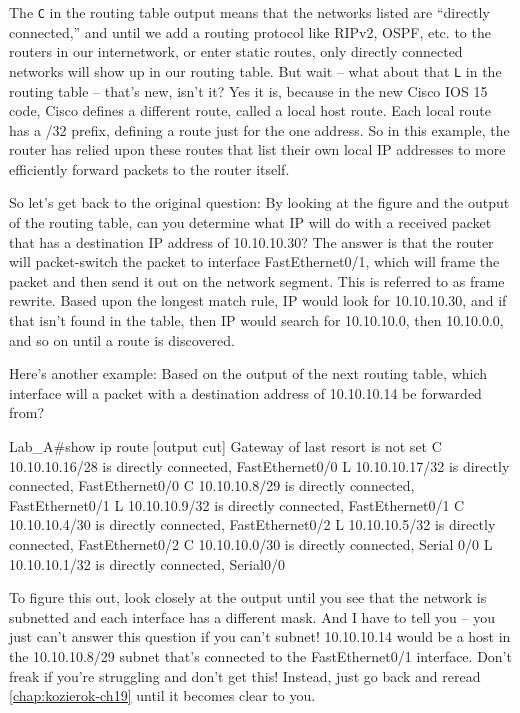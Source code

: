 The \texttt{C} in the routing table output means that the networks
listed are ``directly connected,'' and until we add a routing protocol
like RIPv2, OSPF, etc. to the routers in our internetwork, or enter
static routes, only directly connected networks will show up in our
routing table. But wait -- what about that \texttt{L} in the routing
table -- that's new, isn't it? Yes it is, because in the new Cisco IOS 15
code, Cisco defines a different route, called a local host route. Each
local route has a /32 prefix, defining a route just for the one address.
So in this example, the router has relied upon these routes that list
their own local IP addresses to more efficiently forward packets to the
router itself.

\protect\hypertarget{c09.xhtmlux5cux23Page_361}{}{}So let's get back to
the original question: By looking at the figure and the output of the
routing table, can you determine what IP will do with a received packet
that has a destination IP address of 10.10.10.30? The answer is that the
router will packet-switch the packet to interface FastEthernet0/1,
which will frame the packet and then send it out on the network segment.
This is referred to as frame rewrite. Based upon the longest match rule,
IP would look for 10.10.10.30, and if that isn't found in the table,
then IP would search for 10.10.10.0, then 10.10.0.0, and so on until a
route is discovered.

Here's another example: Based on the output of the next routing table,
which interface will a packet with a destination address of 10.10.10.14
be forwarded from?

\begin{cli}
Lab_A#show ip route
[output cut]
Gateway of last resort is not set
C      10.10.10.16/28 is directly connected, FastEthernet0/0
L      10.10.10.17/32 is directly connected, FastEthernet0/0
C      10.10.10.8/29 is directly connected, FastEthernet0/1
L      10.10.10.9/32 is directly connected, FastEthernet0/1
C      10.10.10.4/30 is directly connected, FastEthernet0/2
L      10.10.10.5/32 is directly connected, FastEthernet0/2
C      10.10.10.0/30 is directly connected, Serial 0/0
L      10.10.10.1/32 is directly connected, Serial0/0
\end{cli}

To figure this out, look closely at the output until you see that the
network is subnetted and each interface has a different mask. And I have
to tell you -- you just can't answer this question if you can't subnet!
10.10.10.14 would be a host in the 10.10.10.8/29 subnet that's connected
to the FastEthernet0/1 interface. Don't freak if you're struggling and
don't get this! Instead, just go back and reread \cref{chap:kozierok-ch19} until it becomes clear to you.



